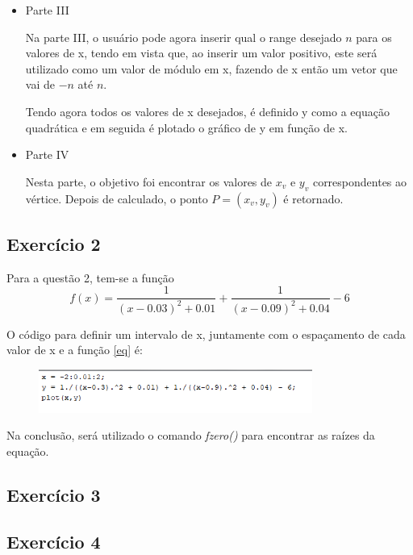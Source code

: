\documentclass[12pt]{article}
\begin{document}
\begin{itemize}
    \item Parte III
    
    Na parte III, o usuário pode agora inserir qual o range desejado $n$ para os valores de x, tendo em vista que, ao inserir um valor positivo, este será 
    utilizado como um valor de módulo em x, fazendo de x então um vetor que vai de $-n$ até $n$.

    Tendo agora todos os valores de x desejados, é definido y como a equação quadrática e em seguida é plotado o gráfico de y em função de x.

    \item Parte IV
    
    Nesta parte, o objetivo foi encontrar os valores de $x_v$ e $y_v$ correspondentes ao vértice. Depois de calculado, o ponto $P=(x_v, y_v)$ é retornado.
\end{itemize}

\subsection{Exercício 2}

Para a questão 2, tem-se a função 
\begin{equation}
    f(x) = \frac{1}{(x-0.03)^2 + 0.01} + \frac{1}{(x-0.09)^2 + 0.04} - 6
    \label{eq}
\end{equation}

O código para definir um intervalo de x, juntamente com o espaçamento de cada valor de x e a função \ref{eq} é:
\begin{figure}[H]
    \begin{center}
        \includegraphics[width=0.8\textwidth]{questao2.png}
    \end{center}
\end{figure}

Na conclusão, será utilizado o comando \emph{fzero()} para encontrar as raízes da equação.

\subsection{Exercício 3}



\subsection{Exercício 4}
\end{document}

